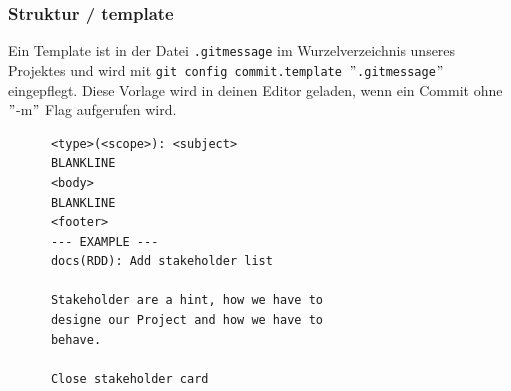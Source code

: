 \documentclass[
   draft=false
  ,paper=a4
  ,twoside=false
  ,fontsize=11pt
  ,headsepline
  ,DIV=11
  ,parskip=full+
  ,titlepage
]{scrartcl} %
\begin{document}
  \subsubsection{Struktur / template}
    \begin{minipage}[t]{0.45\linewidth}
      Ein Template ist in der Datei \texttt{.gitmessage} im Wurzelverzeichnis 
      unseres Projektes und wird mit 
      \newline 
      \scriptsize 
      \texttt{git config commit.template $"$.gitmessage$"$}
      \newline
    \normalsize
  eingepflegt. Diese Vorlage wird in deinen Editor geladen,
   wenn ein Commit ohne $"$-m$"$ Flag aufgerufen wird. 
  \end{minipage}%
  \hfill
  \begin{minipage}[t]{0.45\linewidth}
    \begin{lstlisting}
      <type>(<scope>): <subject>
      BLANKLINE
      <body>
      BLANKLINE
      <footer>
      --- EXAMPLE ---
      docs(RDD): Add stakeholder list
      
      Stakeholder are a hint, how we have to 
      designe our Project and how we have to 
      behave.
      
      Close stakeholder card
    \end{lstlisting}
  \end{minipage}%
  \newline
\end{document}
